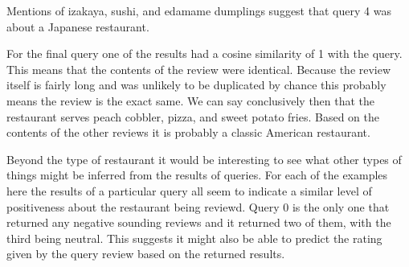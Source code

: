 \documentclass[paper=a4, fontsize=11pt]{jhwhw} %
\begin{document}
Mentions of izakaya, sushi, and edamame dumplings suggest that query 4 was about a Japanese restaurant. 

For the final query one of the results had a cosine similarity of 1 with the query. This means that the contents of the review were identical. Because the review itself is fairly long and was unlikely to be duplicated by chance this probably means the review is the exact same. We can say conclusively then that the restaurant serves peach cobbler, pizza, and sweet potato fries. Based on the contents of the other reviews it is probably a classic American restaurant. 


Beyond the type of restaurant it would be interesting to see what other types of things might be inferred from the results of queries. For each of the examples here the results of a particular query all seem to indicate a similar level of positiveness about the restaurant being reviewd. Query 0 is the only one that returned any negative sounding reviews and it returned two of them, with the third being neutral. This suggests it might also be able to predict the rating given by the query review based on the returned results.
\end{document}
